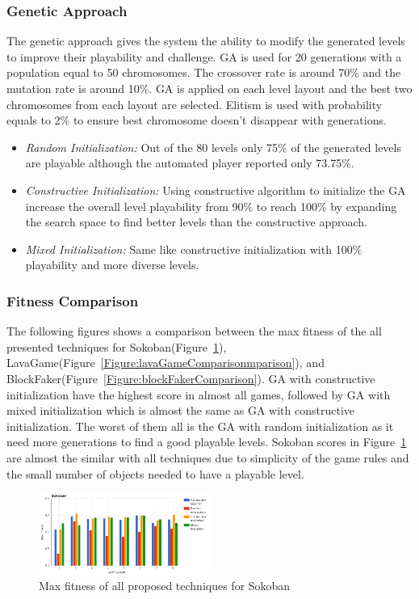 \documentclass[letterpaper]{article}
\newcommand{\figref}[1]{Figure~\ref{Figure:#1}}
\begin{document}
\subsubsection{Genetic Approach}
The genetic approach gives the system the ability to modify the generated levels to improve their playability and challenge. GA is used for 20 generations with a population equal to 50 chromosomes. The crossover rate is around 70\% and the mutation rate is around 10\%. GA is applied on each level layout and the best two chromosomes from each layout are selected. Elitism is used with probability equals to 2\% to ensure best chromosome doesn't disappear with generations.
\begin{itemize}
	\item \emph{Random Initialization:} Out of the 80 levels only 75\% of the generated levels are playable although the automated player reported only 73.75\%.
	\item \emph{Constructive Initialization:} Using constructive algorithm to initialize the GA increase the overall level playability from 90\% to reach 100\% by expanding the search space to find better levels than the constructive approach.
	\item \emph{Mixed Initialization:} Same like constructive initialization with 100\% playability and more diverse levels.
\end{itemize}

\subsubsection{Fitness Comparison}
The following figures shows a comparison between the max fitness of the all presented techniques for Sokoban(\figref{sokobanComparison}), LavaGame(\figref{lavaGameComparisonmparison}), and BlockFaker(\figref{blockFakerComparison}). GA with constructive initialization have the highest score in almost all games, followed by GA with mixed initialization which is almost the same as GA with constructive initialization. The worst of them all is the GA with random initialization as it need more generations to find a good playable levels. Sokoban scores in \figref{sokobanComparison} are almost the similar with all techniques due to simplicity of the game rules and the small number of objects needed to have a playable level.

\begin{figure}
  	\centering
    \includegraphics[width=0.5\textwidth]{Images/sokobanComparison}
    \caption{Max fitness of all proposed techniques for Sokoban}
    \label{Figure:sokobanComparison}
\end{figure}
\end{document}
